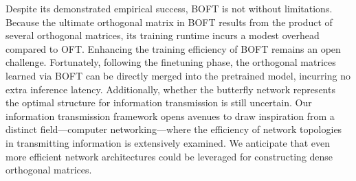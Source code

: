 Despite its demonstrated empirical success, BOFT is not without limitations. Because the ultimate orthogonal matrix in BOFT results from the product of several orthogonal matrices, its training runtime incurs a modest overhead compared to OFT. Enhancing the training efficiency of BOFT remains an open challenge. Fortunately, following the finetuning phase, the orthogonal matrices learned via BOFT can be directly merged into the pretrained model, incurring no extra inference latency. Additionally, whether the butterfly network represents the optimal structure for information transmission is still uncertain. Our information transmission framework opens avenues to draw inspiration from a distinct field—computer networking—where the efficiency of network topologies in transmitting information is extensively examined. We anticipate that even more efficient network architectures could be leveraged for constructing dense orthogonal matrices.

